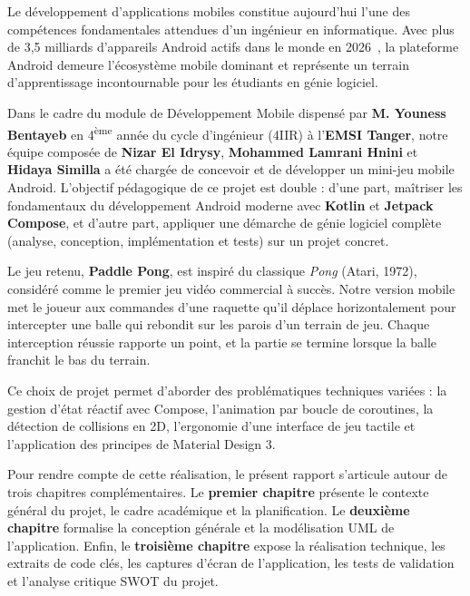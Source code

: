\documentclass[12pt,a4paper]{report}
\begin{document}
Le d\'eveloppement d'applications mobiles constitue aujourd'hui l'une des comp\'etences fondamentales attendues d'un ing\'enieur en informatique. Avec plus de 3,5 milliards d'appareils Android actifs dans le monde en 2026~\cite{statcounter}, la plateforme Android demeure l'\'ecosyst\`eme mobile dominant et repr\'esente un terrain d'apprentissage incontournable pour les \'etudiants en g\'enie logiciel.

Dans le cadre du module de D\'eveloppement Mobile dispens\'e par \textbf{M. Youness Bentayeb} en 4\textsuperscript{\`eme} ann\'ee du cycle d'ing\'enieur (4IIR) \`a l'\textbf{EMSI Tanger}, notre \'equipe compos\'ee de \textbf{Nizar El Idrysy}, \textbf{Mohammed Lamrani Hnini} et \textbf{Hidaya Similla} a \'et\'e charg\'ee de concevoir et de d\'evelopper un mini-jeu mobile Android. L'objectif p\'edagogique de ce projet est double : d'une part, ma\^itriser les fondamentaux du d\'eveloppement Android moderne avec \textbf{Kotlin} et \textbf{Jetpack Compose}, et d'autre part, appliquer une d\'emarche de g\'enie logiciel compl\`ete (analyse, conception, impl\'ementation et tests) sur un projet concret.

Le jeu retenu, \textbf{Paddle Pong}, est inspir\'e du classique \textit{Pong} (Atari, 1972), consid\'er\'e comme le premier jeu vid\'eo commercial \`a succ\`es. Notre version mobile met le joueur aux commandes d'une raquette qu'il d\'eplace horizontalement pour intercepter une balle qui rebondit sur les parois d'un terrain de jeu. Chaque interception r\'eussie rapporte un point, et la partie se termine lorsque la balle franchit le bas du terrain.

Ce choix de projet permet d'aborder des probl\'ematiques techniques vari\'ees : la gestion d'\'etat r\'eactif avec Compose, l'animation par boucle de coroutines, la d\'etection de collisions en 2D, l'ergonomie d'une interface de jeu tactile et l'application des principes de Material Design 3.

Pour rendre compte de cette r\'ealisation, le pr\'esent rapport s'articule autour de trois chapitres compl\'ementaires. Le \textbf{premier chapitre} pr\'esente le contexte g\'en\'eral du projet, le cadre acad\'emique et la planification. Le \textbf{deuxi\`eme chapitre} formalise la conception g\'en\'erale et la mod\'elisation UML de l'application. Enfin, le \textbf{troisi\`eme chapitre} expose la r\'ealisation technique, les extraits de code cl\'es, les captures d'\'ecran de l'application, les tests de validation et l'analyse critique SWOT du projet.
\end{document}
